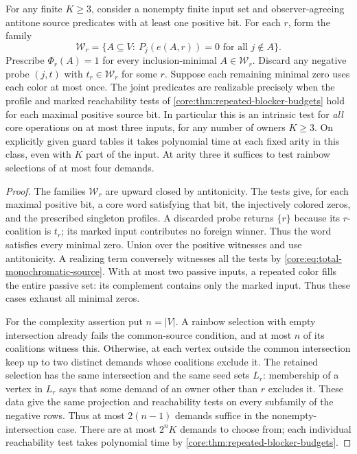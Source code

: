 \begin{corollary}
\label{core:cor:ternary-guard-recognition}
For any finite $K\geq3$, consider a nonempty finite input set and
observer-agreeing antitone source predicates with at least one positive
bit. For each $r$, form the family
\[
 \mathcal W_r=\{A\subseteq V:\ P_j(e(A,r))=0\text{ for all }j\notin A\}.
\]
Prescribe $\Phi_r(A)=1$ for every inclusion-minimal
$A\in\mathcal W_r$. Discard any negative probe $(j,t)$ with
$t_r\in\mathcal W_r$ for some $r$. Suppose each remaining minimal
zero uses each color at most once. The joint predicates are realizable precisely
when the profile and marked reachability tests of
\cref{core:thm:repeated-blocker-budgets} hold for each maximal
positive source bit. In particular this is an intrinsic test for
\emph{all} core operations on at most three inputs, for any number of
owners $K\geq3$. On explicitly given guard tables it takes polynomial
time at each fixed arity in this class, even with $K$ part of the input.
At arity three it suffices to test rainbow selections of at most four
demands.
\end{corollary}
\begin{proof}
The families $\mathcal W_r$ are upward closed by antitonicity.
The tests give, for each maximal positive bit, a core word satisfying
that bit, the injectively colored zeros, and the prescribed singleton
profiles. A discarded probe returns $\{r\}$ because its $r$-coalition
is $t_r$; its marked input contributes no foreign winner.
Thus the word satisfies every minimal zero. Union over the positive witnesses and use
antitonicity. A realizing term conversely witnesses all the tests by
\eqref{core:eq:total-monochromatic-source}. With at most two passive
inputs, a repeated color fills the entire passive set: its complement
contains only the marked input. Thus these cases exhaust all minimal zeros.

For the complexity assertion put $n=|V|$. A rainbow selection with
empty intersection already fails the common-source condition, and at
most $n$ of its coalitions witness this. Otherwise, at each vertex
outside the common intersection keep up to two distinct demands whose
coalitions exclude it. The retained selection has the same intersection
and the same seed sets $L_r$: membership of a vertex in $L_r$ says
that some demand of an owner other than $r$ excludes it. These data
give the same projection and reachability tests on every subfamily
of the negative rows. Thus at most $2(n-1)$ demands suffice in the
nonempty-intersection case. There are at most $2^nK$ demands to choose
from; each individual reachability test takes polynomial time by
\cref{core:thm:repeated-blocker-budgets}.
\end{proof}

